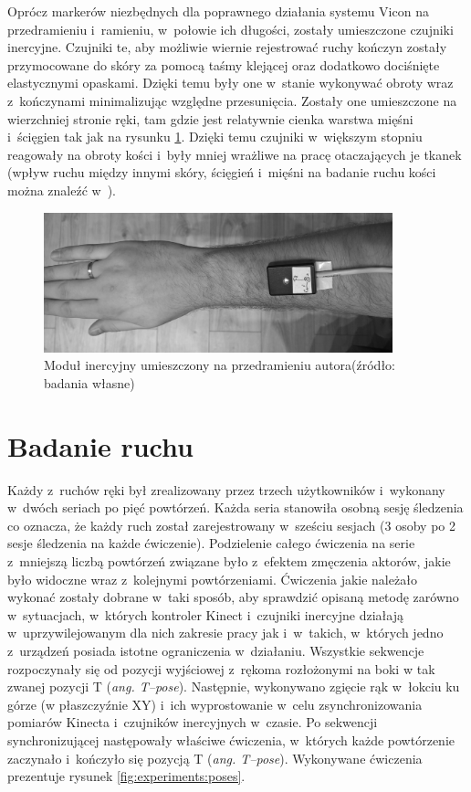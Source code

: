 Oprócz markerów niezbędnych dla poprawnego działania systemu Vicon na przedramieniu i~ramieniu, w~połowie ich długości, zostały umieszczone czujniki inercyjne. Czujniki te, aby możliwie wiernie rejestrować ruchy kończyn zostały przymocowane do skóry za pomocą taśmy klejącej oraz dodatkowo dociśnięte elastycznymi opaskami. Dzięki temu były one w~stanie wykonywać obroty wraz z~kończynami minimalizując względne przesunięcia. Zostały one umieszczone na wierzchniej stronie ręki, tam gdzie jest relatywnie cienka warstwa mięśni i~ścięgien tak jak na rysunku \ref{fig:experiments:handMarker}. Dzięki temu czujniki w~większym stopniu reagowały na obroty kości i~były mniej wrażliwe na pracę otaczających je tkanek (wpływ ruchu między innymi skóry, ścięgień i~mięśni na badanie ruchu kości można znaleźć w~\cite{Sati2016,Reinschmidt2016}).
				
\begin{figure}[!htb]
	\centering
	\includegraphics[width=0.9\textwidth]{images/WP_20170423_00_49_25_Raw.jpg}
	\caption{Moduł inercyjny umieszczony na przedramieniu autora(źródło: badania własne)}
	\label{fig:experiments:handMarker}
\end{figure}
				
\section{Badanie ruchu}
				
Każdy z~ruchów ręki był zrealizowany przez trzech użytkowników i~wykonany w~dwóch seriach po pięć powtórzeń. Każda seria stanowiła osobną sesję śledzenia co oznacza, że każdy ruch został zarejestrowany w~sześciu sesjach (3 osoby po 2 sesje śledzenia na każde ćwiczenie). Podzielenie całego ćwiczenia na serie z~mniejszą liczbą powtórzeń związane było z~efektem zmęczenia aktorów, jakie było widoczne wraz z~kolejnymi powtórzeniami. Ćwiczenia jakie należało wykonać zostały dobrane w~taki sposób, aby sprawdzić opisaną metodę zarówno w~sytuacjach, w~których kontroler Kinect i~czujniki inercyjne działają w~uprzywilejowanym dla nich zakresie pracy jak i~w~takich, w~których jedno z~urządzeń posiada istotne ograniczenia w~działaniu. Wszystkie sekwencje rozpoczynały się od pozycji wyjściowej z~rękoma rozłożonymi na boki w tak zwanej pozycji T (\emph{ang. T--pose}). Następnie, wykonywano zgięcie rąk w~łokciu ku górze (w płaszczyźnie XY) i~ich wyprostowanie w~celu zsynchronizowania pomiarów Kinecta i~czujników inercyjnych w~czasie. Po sekwencji synchronizującej następowały właściwe ćwiczenia, w~których każde powtórzenie zaczynało i~kończyło się pozycją T (\emph{ang. T--pose}). Wykonywane ćwiczenia prezentuje rysunek \ref{fig:experiments:poses}.
			
